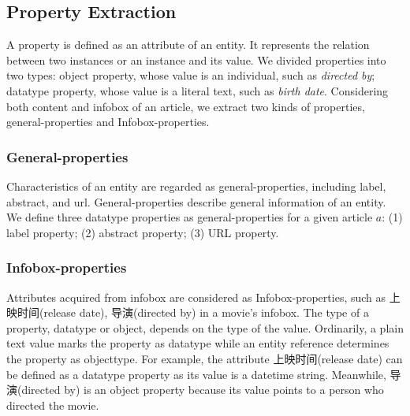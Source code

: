 \documentclass[runningheads,a4paper]{llncs}
\begin{document}
\subsection{Property Extraction}
\label{sec:pe}
A property is defined as an attribute of an entity. It represents the relation between two instances or an instance and its value. We divided properties into two types: object property, whose value is an individual, such as \emph{directed by}; datatype property, whose value is a literal text, such as \emph{birth date}. Considering both content and infobox of an article, we extract two kinds of properties, general-properties and Infobox-properties.

\subsubsection{General-properties}
Characteristics of an entity are regarded as general-properties, including label, abstract, and url. General-properties describe general information of an entity. We define three datatype properties as general-properties for a given article $a$: (1) label property; (2) abstract property; (3) URL property.

\subsubsection{Infobox-properties}
Attributes acquired from infobox are considered as Infobox-properties, such as 上映时间(release date), 导演(directed by) in a movie's infobox. The type of a property, datatype or object, depends on the type of the value. Ordinarily, a plain text value marks the property as datatype while an entity reference determines the property as objecttype. For example, the attribute 上映时间(release date) can be defined as a datatype property as its value is a datetime string. Meanwhile, 导演(directed by) is an object property because its value points to a person who directed the movie.
\end{document}
